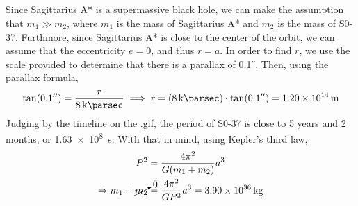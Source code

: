 \documentclass{article}
\begin{document}
\subsection{}

Since Sagittarius A* is a supermassive black hole, we can make the assumption that \(m_1 \gg m_2\), where \(m_1\) is the mass of Sagittarius A* and \(m_2\) is the mass of S0-37.
Furthmore, since Sagittarius A* is close to the center of the orbit, we can assume that the eccentricity \(e = 0\), and thus \(r = a\).
In order to find \(r\), we use the scale provided to determine that there is a parallax of \ang{;;0.1}.
Then, using the parallax formula,
\begin{equation}
    \tan(\ang{;;0.1}) = \frac{r}{\SI{8}{\kilo\parsec}} \implies r = (\SI{8}{\kilo\parsec}) \cdot \tan(\ang{;;0.1}) = \SI{1.20e+14}{\meter}
\end{equation}
Judging by the timeline on the .gif, the period of S0-37 is close to 5 years and 2 months, or \SI{1.63e+8}{\second}.
With that in mind, using Kepler's third law,
\begin{align}
    P^2 &= \frac{4\pi^2}{G (m_1 + m_2)} a^3 \\
    \Rightarrow m_1 + \cancelto{0}{m_2} &= \frac{4\pi^2}{G P^2} a^3 = \SI{3.90e+36}{\kilogram}
\end{align}
\end{document}

